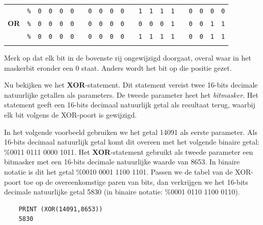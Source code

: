 \begin{center}
	\begin{tabular}{ccccccccccccccccccccc}
	  & \texttt{\%} & \texttt{0} & \texttt{0} & \texttt{0} & \texttt{0} & & \texttt{0} & \texttt{0} & \texttt{0} & \texttt{0} & & \texttt{1} & \texttt{1} & \texttt{1} & \texttt{1} & & \texttt{0} & \texttt{0} & \texttt{0} & \texttt{0} \\	  {\bf OR} & \texttt{\%} & \texttt{0} & \texttt{0} & \texttt{0} & \texttt{0} & & \texttt{0} & \texttt{0} & \texttt{0} & \texttt{0} & & \texttt{0} & \texttt{0} & \texttt{0} & \texttt{1} & & \texttt{0} & \texttt{0} & \texttt{1} & \texttt{1} \\ \hline	  & \texttt{\%} & \texttt{0} & \texttt{0} & \texttt{0} & \texttt{0} & & \texttt{0} & \texttt{0} & \texttt{0} & \texttt{0} & & \texttt{1} & \texttt{1} & \texttt{1} & \texttt{1} & & \texttt{0} & \texttt{0} & \texttt{1} & \texttt{1} \\ \hhline{=====================}
	  \end{tabular}
\end{center}

Merk op dat elk bit in de bovenste rij ongewijzigd doorgaat, overal waar in het maskerbit eronder een 0 staat. Anders wordt het bit op die positie gezet.

Nu bekijken we het {\bf XOR}-statement. Dit statement vereist twee 16-bits decimale natuurlijke getallen als parameters. De tweede parameter heet het {\it bitmasker}. Het statement geeft een 16-bits decimaal natuurlijk getal als resultaat terug, waarbij elk bit volgens de XOR-poort is gewijzigd.

In het volgende voorbeeld gebruiken we het getal 14091 als eerste parameter. Als 16-bits decimaal natuurlijk getal komt dit overeen met het volgende binaire getal: \%0011 0111 0000 1011. Het {\bf XOR}-statement gebruikt als tweede parameter een bitmasker met een 16-bits decimale natuurlijke waarde van 8653. In binaire notatie is dit het getal \%0010 0001 1100 1101. Passen we de tabel van de XOR-poort toe op de overeenkomstige paren van bits, dan verkrijgen we het 16-bits decimale natuurlijke getal 5830 (in binaire notatie: \%0001 0110 1100 0110).

\begin{tcolorbox}[colback=black,coltext=white]
\verbatimfont{\codefont}
\begin{verbatim}
	PRINT (XOR(14091,8653))
	5830
\end{verbatim}
\end{tcolorbox}


